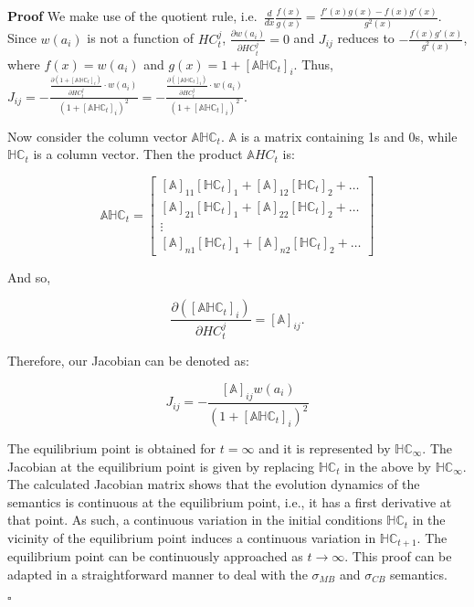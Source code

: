 \documentclass{article}
\newcommand{\AF}{\mathcal{F}}
\newcommand{\A}{\mathcal{A}}
\newcommand{\Adj}{\mathbb{A}}
\newcommand{\HC}{\mathbb{HC}}
\newcommand{\D}{\mathcal{D}}
\newtheorem{proposition}{Proposition}
\newenvironment{proof}{\textbf{Proof}}{\hfill$\square$}
\begin{document}
\begin{proof}
We make use of the quotient rule, i.e.\
$\frac{d}{dx} \frac{f(x)}{g(x)}=\frac{f'(x) g(x) -f(x) g'(x)}{g^2(x)}$.
Since $w(a_i)$ is not a function of $HC^j_t$, $\frac{\partial w(a_i)}{\partial HC^j_t}=0$ and $J_{ij}$ reduces to
$- \frac{f(x) g'(x)}{g^2(x)}$, where $f(x) = w(a_i)$ and $g(x) = 1 + [\Adj \HC_t]_i$.
%
Thus, $J_{ij}=-\frac{ \frac{\partial (1+[\Adj \HC_{t}]_i)}{\partial HC^j_t} \cdot w(a_i)}{(1+[\Adj\HC_t]_i)^2} = -\frac{ \frac{\partial([\Adj\HC_{t}]_i)}{\partial HC^j_t} \cdot w(a_i)}{(1+[\Adj\HC_t]_i)^2} $.

Now consider the column vector $\Adj\HC_{t}$. $\Adj$ is a matrix containing 1s and 0s, while  $\HC_t$ is a column vector. Then the product $\Adj HC_{t}$ is:

$$\Adj{\HC_{t}}=
\begin{bmatrix}
[\Adj]_{11}[\HC_{t}]_1 + [\Adj]_{12}[\HC_{t}]_2 +\ldots \\
[\Adj]_{21}[\HC_{t}]_1 + [\Adj]_{22}[\HC_{t}]_2 +\ldots \\

\vdots
\\
[\Adj]_{n1}[\HC_{t}]_1 + [\Adj]_{n2}[\HC_{t}]_2 +\ldots

\end{bmatrix}
$$

And so, 

$$\frac{\partial([\Adj \HC_{t}]_i)}{\partial HC^j_t}=[\Adj]_{ij}.$$

Therefore, our Jacobian can be denoted as:

$$J_{ij}=-\frac{[\Adj]_{ij}w(a_i)}{(1+[\Adj\HC_t]_i)^2}$$

The equilibrium point is obtained for $t=\infty$ and it is represented by $\HC_{\infty}$. The Jacobian at the equilibrium point is given by replacing $\HC_t$ in the above by $\HC_{\infty}$.
%
The calculated Jacobian matrix shows that the evolution dynamics of the semantics is continuous at the equilibrium point, i.e., it has a first derivative at that point. As such, a continuous variation in the initial conditions 
$\HC_t$ in the vicinity of the equilibrium point induces a continuous variation in $\HC_{t+1}$. The equilibrium point can be continuously approached as $t\rightarrow \infty$.
%
This proof can be adapted in a straightforward manner to deal with the $\sigma_{MB}$ and $\sigma_{CB}$ semantics.

\end{proof}



\end{document}
